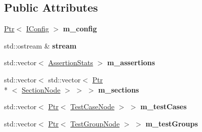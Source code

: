 \subsection*{Public Attributes}
\begin{DoxyCompactItemize}
\item 
\hypertarget{struct_catch_1_1_cumulative_reporter_base_a19a52c03908bdc2f781a99d844f07c8e}{\hyperlink{class_catch_1_1_ptr}{Ptr}$<$ \hyperlink{struct_catch_1_1_i_config}{I\-Config} $>$ {\bfseries m\-\_\-config}}\label{struct_catch_1_1_cumulative_reporter_base_a19a52c03908bdc2f781a99d844f07c8e}

\item 
\hypertarget{struct_catch_1_1_cumulative_reporter_base_add96a41a3e449be82c629a9cefc84aac}{std\-::ostream \& {\bfseries stream}}\label{struct_catch_1_1_cumulative_reporter_base_add96a41a3e449be82c629a9cefc84aac}

\item 
\hypertarget{struct_catch_1_1_cumulative_reporter_base_acb33a9784c0e8c0b8d477dff96ed36cb}{std\-::vector$<$ \hyperlink{struct_catch_1_1_assertion_stats}{Assertion\-Stats} $>$ {\bfseries m\-\_\-assertions}}\label{struct_catch_1_1_cumulative_reporter_base_acb33a9784c0e8c0b8d477dff96ed36cb}

\item 
\hypertarget{struct_catch_1_1_cumulative_reporter_base_ad88d6066ef6c5ef1f02f64a41672d259}{std\-::vector$<$ std\-::vector$<$ \hyperlink{class_catch_1_1_ptr}{Ptr}\\*
$<$ \hyperlink{struct_catch_1_1_cumulative_reporter_base_1_1_section_node}{Section\-Node} $>$ $>$ $>$ {\bfseries m\-\_\-sections}}\label{struct_catch_1_1_cumulative_reporter_base_ad88d6066ef6c5ef1f02f64a41672d259}

\item 
\hypertarget{struct_catch_1_1_cumulative_reporter_base_aabb351de73df367d80ec12734997448c}{std\-::vector$<$ \hyperlink{class_catch_1_1_ptr}{Ptr}$<$ \hyperlink{struct_catch_1_1_cumulative_reporter_base_1_1_node}{Test\-Case\-Node} $>$ $>$ {\bfseries m\-\_\-test\-Cases}}\label{struct_catch_1_1_cumulative_reporter_base_aabb351de73df367d80ec12734997448c}

\item 
\hypertarget{struct_catch_1_1_cumulative_reporter_base_a39db5cc0dc6646aa42f20b2b981b9ae5}{std\-::vector$<$ \hyperlink{class_catch_1_1_ptr}{Ptr}$<$ \hyperlink{struct_catch_1_1_cumulative_reporter_base_1_1_node}{Test\-Group\-Node} $>$ $>$ {\bfseries m\-\_\-test\-Groups}}\label{struct_catch_1_1_cumulative_reporter_base_a39db5cc0dc6646aa42f20b2b981b9ae5}


\end{DoxyCompactItemize}
